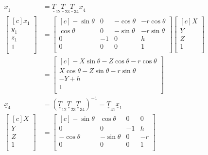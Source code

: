 \documentclass[onecolumn,10pt]{jhwhw}
\def\du#1{\underline{\underline{#1}}}
\begin{document}
\begin{align*}
\underline{x}_1 &= \du{T}_{12} \du{T}_{23} \du{T}_{34} \underline{x}_4 \\
\begin{bmatrix*}[c]
x_1 \\
y_1 \\
z_1 \\
1 \\
\end{bmatrix*}
& =
\begin{bmatrix*}[c]
-\sin \theta &  0 & -\cos \theta & -r \cos \theta \\
 \cos \theta &  0 & -\sin \theta & -r \sin \theta \\
          0 & -1 &           0 &             h \\
          0 &  0 &           0 &             1 \\
\end{bmatrix*}
\begin{bmatrix*}[c]
X \\
Y \\
Z \\
1 \\
\end{bmatrix*}\\
&=
\begin{bmatrix*}[c]
-X \sin \theta - Z \cos \theta - r \cos \theta \\
 X \cos \theta - Z \sin \theta - r \sin \theta \\
                                      -Y + h \\
                                            1 \\
\end{bmatrix*}\\
\underline{x}_4 &= \left ( \du{T}_{12} \du{T}_{23} \du{T}_{34} \right )^{-1} = \du{T}_{41} \underline{x}_1 \\
\begin{bmatrix*}[c]
X \\
Y \\
Z \\
1 \\
\end{bmatrix*}
&=
\begin{bmatrix*}[c]
 -\sin\theta &  \cos\theta &  0 &  0 \\
           0 &           0 & -1 &  h \\
 -\cos\theta & -\sin\theta &  0 & -r \\
           0 &           0 &  0 &  1 \\

\end{bmatrix*}
\end{align*}
\end{document}
